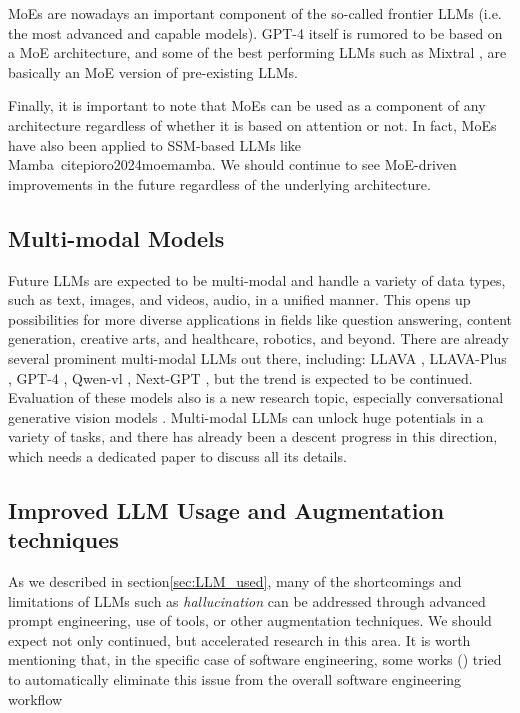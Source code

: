 \documentclass[conference]{IEEEtran}
\begin{document}
MoEs are nowadays an important component of the so-called frontier LLMs (i.e. the most advanced and capable models). GPT-4 itself is rumored to be based on a MoE architecture, and some of the best performing LLMs such as Mixtral \cite{mixtral}, are basically an MoE version of pre-existing LLMs. 

Finally, it is important to note that MoEs can be used as a component of any architecture regardless of whether it is based on attention or not. In fact, MoEs have also been applied to SSM-based LLMs like Mamba\ cite{pioro2024moemamba}. We should continue to see MoE-driven improvements in the future regardless of the underlying architecture.

\subsection{Multi-modal Models}
Future LLMs are expected to be multi-modal and handle a variety of data types, such as text, images, and videos, audio, in a unified manner. 
This opens up possibilities for more diverse applications in fields like question answering, content generation, creative arts, and healthcare, robotics, and beyond.
There are already several prominent multi-modal LLMs out there, including: LLAVA 
\cite{liu2023visual}, LLAVA-Plus \cite{liu2023llava}, GPT-4 \cite{gpt4}, Qwen-vl \cite{bai2023qwen}, Next-GPT \cite{wu2023next}, but the trend is expected to be continued. Evaluation of these models also is a new research topic, especially conversational generative vision models \cite{khasmakhi2023convgenvismo}.
Multi-modal LLMs can unlock huge potentials in a variety of tasks, and there has already been a descent progress in this direction, which needs a dedicated paper to discuss all its details.


\subsection{Improved LLM Usage and Augmentation techniques}

As we described in section\ref{sec:LLM_used}, many of the shortcomings and limitations of LLMs such as \emph{hallucination} can be addressed through advanced prompt engineering, use of tools, or other augmentation techniques. We should expect not only continued, but accelerated research in this area. 
It is worth mentioning that, in the specific case of software engineering, some works (\cite{alshahwan2024automated}) tried to automatically  eliminate this issue from the overall software engineering workflow
\end{document}
